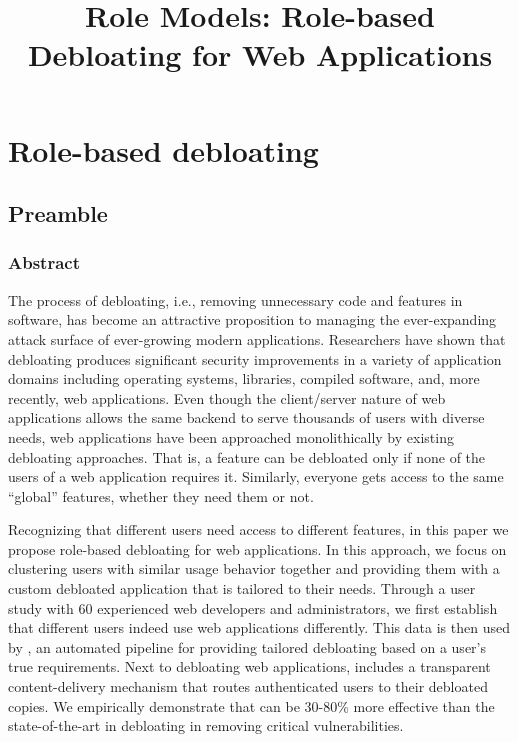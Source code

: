 \chapter{Role-based debloating}
\label{chap:dbltr}
\section*{Preamble}

\title*{Role Models: Role-based Debloating for Web Applications}

\subsection*{Abstract}
The process of debloating, i.e., removing unnecessary code and features in software, has become an attractive proposition to managing the ever-expanding attack surface of ever-growing modern applications. Researchers have shown that debloating produces significant security improvements in a variety of application domains including operating systems, libraries, compiled software, and, more recently, web applications. Even though the client/server nature of web applications allows the same backend to serve thousands of users with diverse needs, web applications have been approached monolithically by existing debloating approaches. That is, a feature can be debloated only if none of the users of a web application requires it. Similarly, everyone gets access to the same ``global'' features, whether they need them or not.

Recognizing that different users need access to different features, in this paper we propose role-based debloating for web applications. In this approach, we focus on clustering users with similar usage behavior together and providing them with a custom debloated application that is tailored to their needs. Through a user study with 60 experienced web developers and administrators, we first establish that different users indeed use web applications differently. This data is then used by \sys{}, an automated pipeline for providing tailored debloating based on a user's true requirements. Next to debloating web applications, \sys{} includes a transparent content-delivery mechanism that routes authenticated users to their debloated copies. 
We empirically demonstrate that \sys{} can be 30-80\% more effective than the state-of-the-art in debloating in removing critical vulnerabilities. 









%


